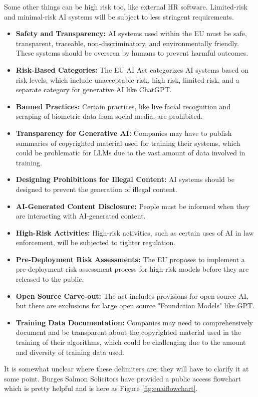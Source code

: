 Some other things can be high risk too, like external HR software. Limited-risk and minimal-risk AI systems will be subject to less stringent requirements. 
\begin{itemize}
  \item \textbf{Safety and Transparency:} AI systems used within the EU must be safe, transparent, traceable, non-discriminatory, and environmentally friendly. These systems should be overseen by humans to prevent harmful outcomes.
  \item \textbf{Risk-Based Categories:} The EU AI Act categorizes AI systems based on risk levels, which include unacceptable risk, high risk, limited risk, and a separate category for generative AI like ChatGPT.
  \item \textbf{Banned Practices:} Certain practices, like live facial recognition and scraping of biometric data from social media, are prohibited.
  \item \textbf{Transparency for Generative AI:} Companies may have to publish summaries of copyrighted material used for training their systems, which could be problematic for LLMs due to the vast amount of data involved in training.
  \item \textbf{Designing Prohibitions for Illegal Content:} AI systems should be designed to prevent the generation of illegal content.
  \item \textbf{AI-Generated Content Disclosure:} People must be informed when they are interacting with AI-generated content.
  \item \textbf{High-Risk Activities:} High-risk activities, such as certain uses of AI in law enforcement, will be subjected to tighter regulation.
  \item \textbf{Pre-Deployment Risk Assessments:} The EU proposes to implement a pre-deployment risk assessment process for high-risk models before they are released to the public.
  \item \textbf{Open Source Carve-out:} The act includes provisions for open source AI, but there are exclusions for large open source "Foundation Models" like GPT.
  \item \textbf{Training Data Documentation:} Companies may need to comprehensively document and be transparent about the copyrighted material used in the training of their algorithms, which could be challenging due to the amount and diversity of training data used.
\end{itemize}

It is somewhat unclear where these delimiters are; they will have to clarify it at some point. Burges Salmon Solicitors have provided a public access flowchart which is pretty helpful and is here as Figure \ref{fig:euaiflowchart}.\par


